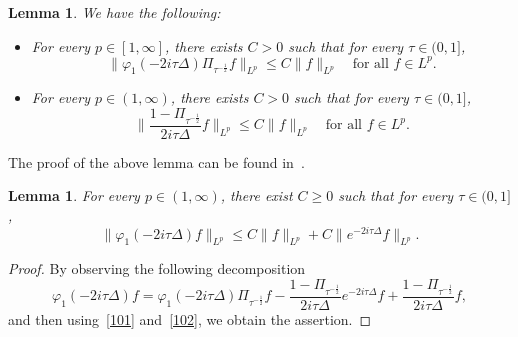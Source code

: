 \documentclass[10pt,a4paper]{article}
\newtheorem{lemma}[theorem]{Lemma}
\begin{document}
  \begin{lemma}\label{lemfilter1}
    We have the following:
    \begin{itemize}
      \item For every \(p \in [1,\infty]\), there exists \(C>0\) such that for every
        \(\tau \in (0,1]\),
        \begin{equation}\label{101}
          \|\varphi_1(-2i\tau\Delta)\Pi_{\tau^{-\frac12}} f\|_{L^p} \leq
          C\|f\|_{L^p} \quad\text{for all } f \in L^p.
        \end{equation}
      \item For every \(p \in (1,\infty)\), there exists \(C>0\) such that for every
        \(\tau \in (0,1]\),
        \begin{equation}\label{102}
          \|\frac{1-\Pi_{\tau^{-\frac12}}}{2i\tau\Delta} f\|_{L^p} \leq
          C\|f\|_{L^p} \quad\text{for all } f \in L^p.
        \end{equation}
    \end{itemize}
  \end{lemma}

  The proof of the above lemma can be found in~\cite{ORS21}.

  \begin{lemma}\label{varphiLp}
    For every \(p \in (1,\infty)\), there exist \(C \geq 0\) such that for every 
    \(\tau \in (0,1]\),
    \begin{equation}\label{decomp}
      \|\varphi_1(-2i\tau\Delta) f\|_{L^p} \leq C \|f\|_{L^p} + C
      \|e^{-2i\tau\Delta}f\|_{L^p}.
    \end{equation}
  \end{lemma}

  \begin{proof}
    By observing the following decomposition 
    \begin{equation}\label{phi1decomp}
      \varphi_1(-2i\tau\Delta) f = \varphi_1(-2i\tau\Delta)\Pi_{\tau^{-\frac12}} f
      - \frac{1 - \Pi_{\tau^{-\frac12}}}{2i\tau\Delta} e^{-2i\tau\Delta} f 
      + \frac{1 - \Pi_{\tau^{-\frac12}}}{2i\tau\Delta} f,
    \end{equation}
    and then using~\eqref{101} and~\eqref{102}, we obtain the assertion.
  \end{proof}
\end{document}
